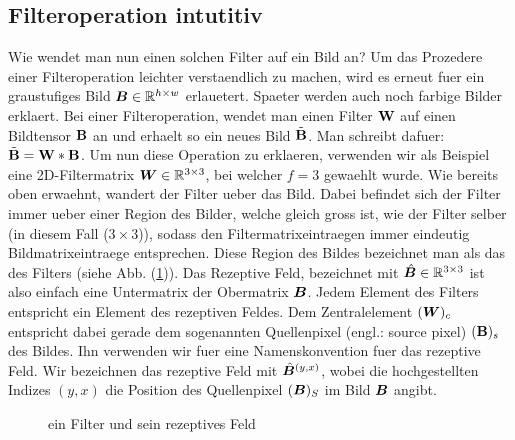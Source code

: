 \subsection{Filteroperation intutitiv}\label{sec:filteroperation_intuitiv}
Wie wendet man nun einen solchen Filter auf ein Bild an? Um das Prozedere einer
Filteroperation leichter verstaendlich zu machen, wird es erneut fuer ein
graustufiges Bild $\bm{B} \in \mathbb{R}^{h \times w}$ erlauetert. Spaeter werden auch noch farbige
Bilder erklaert.
\para{}
Bei einer Filteroperation, wendet man einen Filter $\mathbf{W}$ auf einen Bildtensor
$\mathbf{B}$ an und erhaelt so ein neues Bild $\tilde{\mathbf{B}}$. Man schreibt dafuer:
$\tilde{\mathbf{B}} = \mathbf{W} * \mathbf{B}$.
\para{}
Um nun diese Operation zu erklaeren, verwenden wir als Beispiel eine
2D-Filtermatrix $\bm{W} \in \mathbb{R}^{3 \times 3}$, bei welcher
$f = 3$ gewaehlt wurde.
Wie bereits oben erwaehnt, wandert der Filter ueber das Bild. Dabei befindet
sich der Filter immer ueber einer Region des Bilder, welche gleich gross ist,
wie der Filter selber (in diesem Fall ($3 \times 3$)), sodass den Filtermatrixeintraegen immer eindeutig
Bildmatrixeintraege entsprechen. Diese Region des Bildes bezeichnet man als das
 des Filters (siehe Abb. (\ref{fig:receptive_field})).
Das Rezeptive Feld, bezeichnet mit $\hat{\bm{B}} \in \mathbb{R}^{3 \times 3}$ ist also einfach eine
Untermatrix der Obermatrix $\bm{B}$.
\para{}
Jedem Element des Filters entspricht ein Element des rezeptiven Feldes. Dem
Zentralelement $(\bm{W})_c$ entspricht dabei gerade dem sogenannten Quellenpixel
(engl.: source pixel) $(\mathbf{B})_s$ des Bildes. Ihn verwenden wir fuer eine
Namenskonvention fuer das rezeptive Feld. Wir bezeichnen das rezeptive Feld mit
$\hat{\bm{B}}^{(y,x)}$, wobei die hochgestellten Indizes $(y,x)$ die Position
des Quellenpixel $(\bm{B})_S$ im Bild $\bm{B}$ angibt.

\begin{figure}[h!]

  \caption{ein Filter und sein rezeptives Feld}
  \label{fig:receptive_field}
\end{figure}

